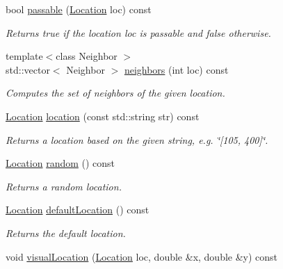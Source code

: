 \begin{DoxyCompactItemize}
bool \hyperlink{structslb_1_1ext_1_1explicit__space_1_1Grid_afc920bb4a27c239b20b16efb0e745401}{passable} (\hyperlink{structslb_1_1ext_1_1explicit__space_1_1Grid_a2b2125f1774b299ea7f0f9f21d967fde}{Location} loc) const 
\begin{DoxyCompactList}\small\item\em Returns {\ttfamily true} if the location {\ttfamily loc} is passable and {\ttfamily false} otherwise. \end{DoxyCompactList}\item 
{\footnotesize template$<$class Neighbor $>$ }\\std\+::vector$<$ Neighbor $>$ \hyperlink{structslb_1_1ext_1_1explicit__space_1_1Grid_ab526a9f0eb4d12dd7ee93b3ff9359bbf}{neighbors} (int loc) const 
\begin{DoxyCompactList}\small\item\em Computes the set of neighbors of the given location. \end{DoxyCompactList}\item 
\hyperlink{structslb_1_1ext_1_1explicit__space_1_1Grid_a2b2125f1774b299ea7f0f9f21d967fde}{Location} \hyperlink{structslb_1_1ext_1_1explicit__space_1_1Grid_a6ff6ce8a97bfe218a3fc4625c3c71b34}{location} (const std\+::string str) const 
\begin{DoxyCompactList}\small\item\em Returns a location based on the given string, e.\+g. \char`\"{}\mbox{[}105, 400\mbox{]}\char`\"{}. \end{DoxyCompactList}\item 
\hyperlink{structslb_1_1ext_1_1explicit__space_1_1Grid_a2b2125f1774b299ea7f0f9f21d967fde}{Location} \hyperlink{structslb_1_1ext_1_1explicit__space_1_1Grid_a1d5777e338c0f81783994f11a594f4a9}{random} () const 
\begin{DoxyCompactList}\small\item\em Returns a random location. \end{DoxyCompactList}\item 
\hyperlink{structslb_1_1ext_1_1explicit__space_1_1Grid_a2b2125f1774b299ea7f0f9f21d967fde}{Location} \hyperlink{structslb_1_1ext_1_1explicit__space_1_1Grid_a10058dd5412f488eac980d89e2256cb9}{default\+Location} () const 
\begin{DoxyCompactList}\small\item\em Returns the default location. \end{DoxyCompactList}\item 
void \hyperlink{structslb_1_1ext_1_1explicit__space_1_1Grid_acaa4f99a13ede903d5a4426b8167d8b2}{visual\+Location} (\hyperlink{structslb_1_1ext_1_1explicit__space_1_1Grid_a2b2125f1774b299ea7f0f9f21d967fde}{Location} loc, double \&x, double \&y) const 

\end{DoxyCompactItemize}
